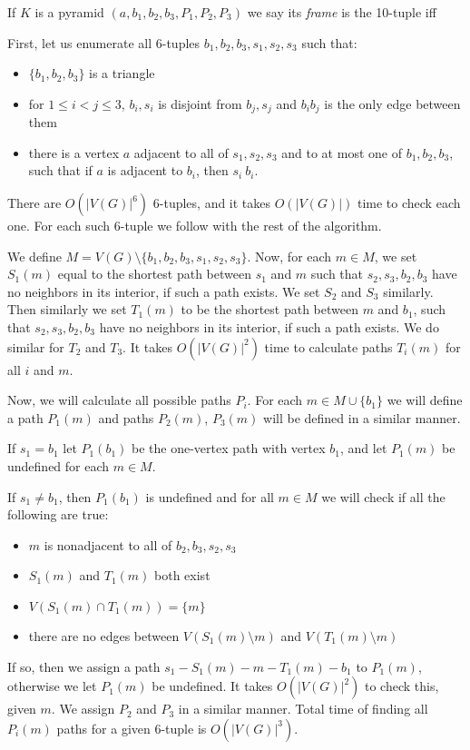 \documentclass{article}
\begin{document}
If $K$ is a pyramid $(a, b_1, b_2, b_3, P_1, P_2, P_3)$ we say its \emph{frame} is the 10-tuple iff


First, let us enumerate all 6-tuples $b_1, b_2, b_3, s_1, s_2, s_3$ such that:
\begin{itemize}
	\item $\{b_1, b_2, b_3\}$ is a triangle
	\item for $1 \leq i < j \leq 3$, ${b_i, s_i}$ is disjoint from ${b_j, s_j}$ and $b_ib_j$ is the only edge between them
	\item there is a vertex $a$ adjacent to all of $s_1, s_2, s_3$ and to at most one of $b_1, b_2, b_3$, such that if $a$ is adjacent to $b_i$, then $s_i \ b_i$.
\end{itemize}

There are $O(|V(G)|^6)$ 6-tuples, and it takes $O(|V(G)|)$ time to check each one. For each such 6-tuple we follow with the rest of the algorithm.

We define $M = V(G) \setminus \{b_1, b_2, b_3, s_1, s_2, s_3\}$. Now, for each $m \in M$, we set $S_1(m)$ equal to the shortest path between $s_1$ and $m$ such that $s_2, s_3, b_2, b_3$ have no neighbors in its interior, if such a path exists. We set $S_2$ and $S_3$ similarly. Then similarly we set $T_1(m)$ to be the shortest path between $m$ and $b_1$, such that $s_2, s_3, b_2, b_3$ have no neighbors in its interior, if such a path exists. We do similar for $T_2$ and $T_3$. It takes $O(|V(G)|^2)$ time to calculate paths $T_i(m)$ for all $i$ and $m$.

Now, we will calculate all possible paths $P_i$. For each $m \in M \cup \{b_1\}$ we will define a path $P_1(m)$ and paths $P_2(m)$, $P_3(m)$ will be defined in a similar manner.

If $s_1 = b_1$ let $P_1(b_1)$ be the one-vertex path with vertex $b_1$, and let $P_1(m)$ be undefined for each $m \in M$.

If $s_1 \neq b_1$, then $P_1(b_1)$ is undefined and for all $m \in M$ we will check if all the following are true:
\begin{itemize}
	\item $m$ is nonadjacent to all of $b_2, b_3, s_2, s_3$
	\item $S_1(m)$ and $T_1(m)$ both exist
	\item $V(S_1(m) \cap T_1(m)) = \{m\}$
	\item there are no edges between $V(S_1(m) \setminus m)$ and $V(T_1(m) \setminus m)$
\end{itemize}
If so, then we assign a path $s_1-S_1(m)-m-T_1(m)-b_1$ to $P_1(m)$, otherwise we let $P_1(m)$ be undefined. It takes $O(|V(G)|^2)$ to check this, given $m$. We assign $P_2$ and $P_3$ in a similar manner. Total time of finding all $P_i(m)$ paths for a given 6-tuple is $O(|V(G)|^3)$.
\end{document}
